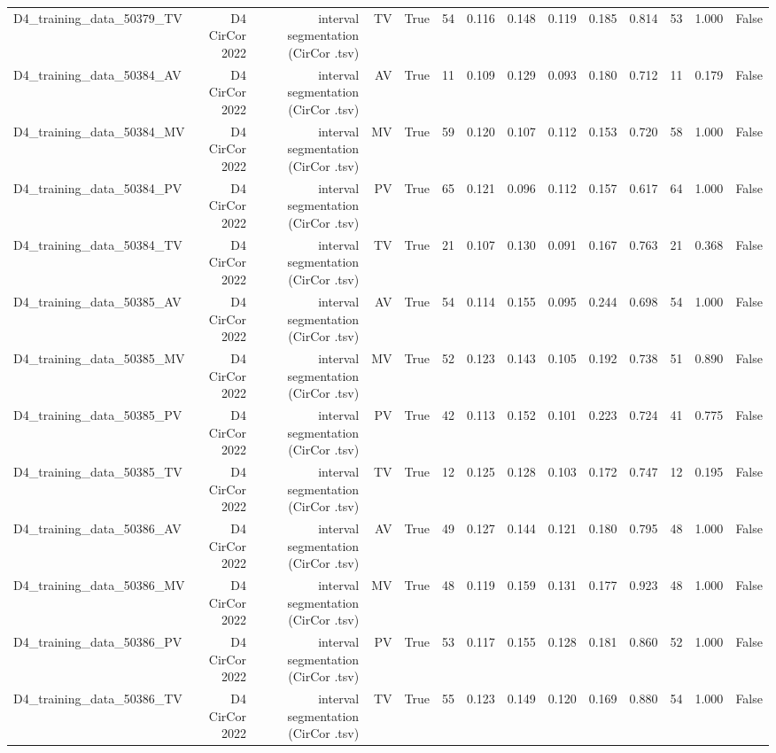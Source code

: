 \begin{table}[htbp]
\begin{tabular}{lrrrrrrrrrrrrr}
    D4\_training\_data\_50379\_TV & D4 CirCor 2022 & interval segmentation (CirCor .tsv) & TV & True & 54 & 0.116 & 0.148 & 0.119 & 0.185 & 0.814 & 53 & 1.000 & False \\
    D4\_training\_data\_50384\_AV & D4 CirCor 2022 & interval segmentation (CirCor .tsv) & AV & True & 11 & 0.109 & 0.129 & 0.093 & 0.180 & 0.712 & 11 & 0.179 & False \\
    D4\_training\_data\_50384\_MV & D4 CirCor 2022 & interval segmentation (CirCor .tsv) & MV & True & 59 & 0.120 & 0.107 & 0.112 & 0.153 & 0.720 & 58 & 1.000 & False \\
    D4\_training\_data\_50384\_PV & D4 CirCor 2022 & interval segmentation (CirCor .tsv) & PV & True & 65 & 0.121 & 0.096 & 0.112 & 0.157 & 0.617 & 64 & 1.000 & False \\
    D4\_training\_data\_50384\_TV & D4 CirCor 2022 & interval segmentation (CirCor .tsv) & TV & True & 21 & 0.107 & 0.130 & 0.091 & 0.167 & 0.763 & 21 & 0.368 & False \\
    D4\_training\_data\_50385\_AV & D4 CirCor 2022 & interval segmentation (CirCor .tsv) & AV & True & 54 & 0.114 & 0.155 & 0.095 & 0.244 & 0.698 & 54 & 1.000 & False \\
    D4\_training\_data\_50385\_MV & D4 CirCor 2022 & interval segmentation (CirCor .tsv) & MV & True & 52 & 0.123 & 0.143 & 0.105 & 0.192 & 0.738 & 51 & 0.890 & False \\
    D4\_training\_data\_50385\_PV & D4 CirCor 2022 & interval segmentation (CirCor .tsv) & PV & True & 42 & 0.113 & 0.152 & 0.101 & 0.223 & 0.724 & 41 & 0.775 & False \\
    D4\_training\_data\_50385\_TV & D4 CirCor 2022 & interval segmentation (CirCor .tsv) & TV & True & 12 & 0.125 & 0.128 & 0.103 & 0.172 & 0.747 & 12 & 0.195 & False \\
    D4\_training\_data\_50386\_AV & D4 CirCor 2022 & interval segmentation (CirCor .tsv) & AV & True & 49 & 0.127 & 0.144 & 0.121 & 0.180 & 0.795 & 48 & 1.000 & False \\
    D4\_training\_data\_50386\_MV & D4 CirCor 2022 & interval segmentation (CirCor .tsv) & MV & True & 48 & 0.119 & 0.159 & 0.131 & 0.177 & 0.923 & 48 & 1.000 & False \\
    D4\_training\_data\_50386\_PV & D4 CirCor 2022 & interval segmentation (CirCor .tsv) & PV & True & 53 & 0.117 & 0.155 & 0.128 & 0.181 & 0.860 & 52 & 1.000 & False \\
    D4\_training\_data\_50386\_TV & D4 CirCor 2022 & interval segmentation (CirCor .tsv) & TV & True & 55 & 0.123 & 0.149 & 0.120 & 0.169 & 0.880 & 54 & 1.000 & False \\

\end{tabular}
\end{table}
